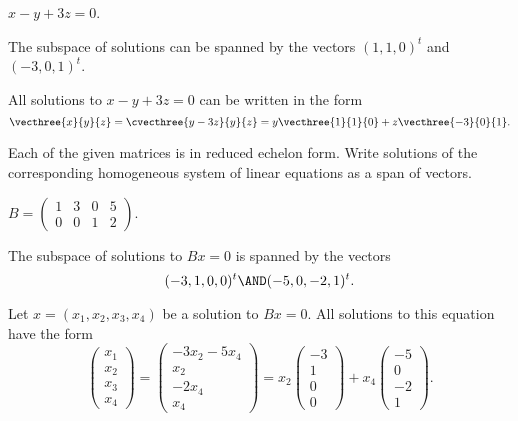 \documentclass{article}
\begin{document}
\begin{exercise} \label{c5.2.1b}
$x - y + 3z = 0$.

\begin{solution}
\ans The subspace of solutions can be spanned by the vectors 
$(1,1,0)^t$ and $(-3,0,1)^t$.

\soln All solutions to $x - y + 3z = 0$ can be written in the form
\[
\vecthree{x}{y}{z} = \cvecthree{y-3z}{y}{z}
= y\vecthree{1}{1}{0} + z\vecthree{-3}{0}{1}.
\]

\end{solution}
\end{exercise}





\problemlabel

\noindent Each of the given matrices is in reduced echelon form.  Write solutions of the corresponding homogeneous system of linear equations as a span of vectors.

\begin{exercise} \label{c5.2.2b}
$B = \left(\begin{array}{rrrr} 1 & 3 & 0 & 5 \\
	0 & 0 & 1 & 2 \end{array}\right)$.

\begin{solution}

\ans The subspace of solutions to $Bx = 0$ is spanned by the vectors
\[
(-3,1,0,0)^t \AND (-5,0,-2,1)^t.
\]

\soln Let $x = (x_1,x_2,x_3,x_4)$ be a solution to $Bx = 0$.  All
solutions to this equation have the form
\[
\left(\begin{array}{r} x_1 \\ x_2 \\ x_3 \\ x_4 \end{array}\right)
= \left(\begin{array}{c} -3x_2 - 5x_4 \\ x_2 \\ -2x_4 \\ x_4
\end{array}\right) = x_2\left(\begin{array}{r} -3 \\ 1 \\ 0 \\ 0
\end{array}\right) + x_4\left(\begin{array}{r} -5 \\ 0 \\ -2 \\ 1
\end{array}\right).
\]

\end{solution}
\end{exercise}
\end{document}
